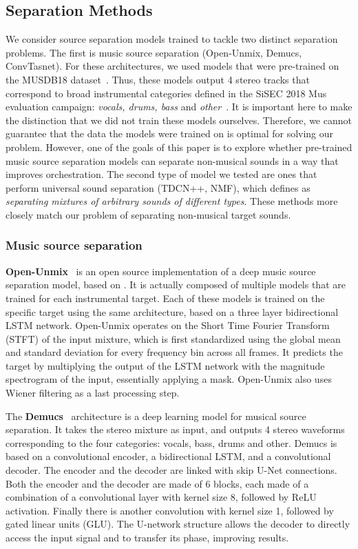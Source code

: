 \documentclass{article}
\begin{document}
    \subsection{Separation Methods}
  We consider source separation models trained to tackle two distinct separation problems. The first is music source separation (Open-Unmix, Demucs, ConvTasnet). For these architectures, we used models that were pre-trained on the MUSDB18 dataset~\cite{MUSDB18}. Thus, these models output 4 stereo tracks that correspond to broad instrumental categories defined in the SiSEC 2018 Mus evaluation campaign: \textit{vocals, drums, bass} and \textit{other}~\cite{Stoter_SiSEC}. It is important here to make the distinction that we did not train these models ourselves. Therefore, we cannot guarantee that the data the models were trained on is optimal for solving our problem. However, one of the goals of this paper is to explore whether pre-trained music source separation models can separate non-musical sounds in a way that improves orchestration.
  The second type of model we tested are ones that perform universal sound separation (TDCN++, NMF), which \cite{tdcnpp} defines as \textit{separating mixtures of arbitrary sounds of different types}. These methods more closely match our problem of separating non-musical target sounds.
      
      \subsubsection{Music source separation}
      \textbf{Open-Unmix}~\cite{open-unmix} is an open source implementation of a deep music source separation model, based on \cite{Uhlich2017}. It is actually composed of multiple models that are trained for each instrumental target. Each of these models is trained on the specific target using the same architecture, based on a three layer bidirectional LSTM network. Open-Unmix operates on the Short Time Fourier Transform (STFT) of the input mixture, which is first standardized using the global mean and standard deviation for every frequency bin across all frames. It predicts the target by multiplying the output of the LSTM network with the magnitude spectrogram of the input, essentially applying a mask. Open-Unmix also uses Wiener filtering as a last processing step.
      
      The \textbf{Demucs}~\cite{demucs} architecture is a deep learning model for musical source separation. It takes the stereo mixture as input, and outputs 4 stereo waveforms corresponding to the four categories: vocals, bass, drums and other. Demucs is based on a convolutional encoder, a bidirectional LSTM, and a convolutional decoder. The encoder and the decoder are linked with skip U-Net connections. Both the encoder and the decoder are made of 6 blocks, each made of a combination of a convolutional layer with kernel size 8, followed by ReLU activation. Finally there is another convolution with kernel size 1, followed by gated linear units (GLU). The U-network structure allows the decoder to directly access the input signal and to transfer its phase, improving results. 
\end{document}
